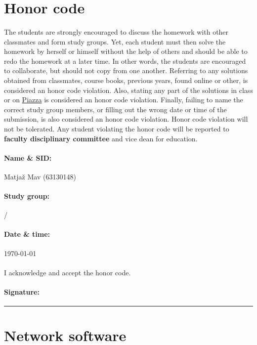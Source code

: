 \documentclass[11pt,a4paper]{article}
\begin{document}
\section*{Honor code}

\paragraph{} The students are strongly encouraged to discuss the homework with other classmates and form study groups. Yet, each student must then solve the homework by herself or himself without the help of others and should be able to redo the homework at a later time. In other words, the students are encouraged to collaborate, but should not copy from one another. Referring to any solutions obtained from classmates, course books, previous years, found online or other, is considered an honor code violation. Also, stating any part of the solutions in class or on \href{https://piazza.com}{Piazza} is considered an honor code violation. Finally, failing to name the correct study group members, or filling out the wrong date or time of the submission, is also considered an honor code violation. Honor code violation will not be tolerated. Any student violating the honor code will be reported to {\bf\color{LimeGreen} faculty disciplinary committee} and vice dean for education.

\vspace*{0.15in}
\paragraph{Name \& SID:} Matjaž Mav (63130148)
\paragraph{Study group:} /
\paragraph{Date \& time:} \today
\paragraph{} I acknowledge and accept the honor code.
\paragraph{Signature:} \rule{2.5in}{0.5pt}

\pagebreak

\section{Network software}
\end{document}
